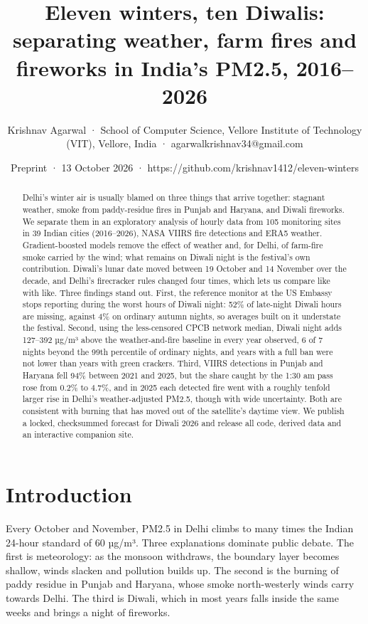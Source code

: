 \documentclass[
  11pt,
]{article}
\title{Eleven winters, ten Diwalis: separating weather, farm fires and
fireworks in India's PM2.5, 2016--2026}
\author{Krishnav Agarwal · School of Computer Science, Vellore Institute
of Technology (VIT), Vellore, India · agarwalkrishnav34@gmail.com}
\date{Preprint · 13 October 2026 ·
https://github.com/krishnav1412/eleven-winters}
\begin{document}
\maketitle
\begin{abstract}
Delhi's winter air is usually blamed on three things that arrive
together: stagnant weather, smoke from paddy-residue fires in Punjab and
Haryana, and Diwali fireworks. We separate them in an exploratory
analysis of hourly data from 105 monitoring sites in 39 Indian cities
(2016--2026), NASA VIIRS fire detections and ERA5 weather.
Gradient-boosted models remove the effect of weather and, for Delhi, of
farm-fire smoke carried by the wind; what remains on Diwali night is the
festival's own contribution. Diwali's lunar date moved between 19
October and 14 November over the decade, and Delhi's firecracker rules
changed four times, which lets us compare like with like. Three findings
stand out. First, the reference monitor at the US Embassy stops
reporting during the worst hours of Diwali night: 52\% of late-night
Diwali hours are missing, against 4\% on ordinary autumn nights, so
averages built on it understate the festival. Second, using the
less-censored CPCB network median, Diwali night adds 127--392 µg/m³
above the weather-and-fire baseline in every year observed, 6 of 7
nights beyond the 99th percentile of ordinary nights, and years with a
full ban were not lower than years with green crackers. Third, VIIRS
detections in Punjab and Haryana fell 94\% between 2021 and 2025, but
the share caught by the 1:30 am pass rose from 0.2\% to 4.7\%, and in
2025 each detected fire went with a roughly tenfold larger rise in
Delhi's weather-adjusted PM2.5, though with wide uncertainty. Both are
consistent with burning that has moved out of the satellite's daytime
view. We publish a locked, checksummed forecast for Diwali 2026 and
release all code, derived data and an interactive companion site.
\end{abstract}

\section{Introduction}\label{introduction}

Every October and November, PM2.5 in Delhi climbs to many times the
Indian 24-hour standard of 60 µg/m³. Three explanations dominate public
debate. The first is meteorology: as the monsoon withdraws, the boundary
layer becomes shallow, winds slacken and pollution builds up. The second
is the burning of paddy residue in Punjab and Haryana, whose smoke
north-westerly winds carry towards Delhi. The third is Diwali, which in
most years falls inside the same weeks and brings a night of fireworks.
\end{document}
